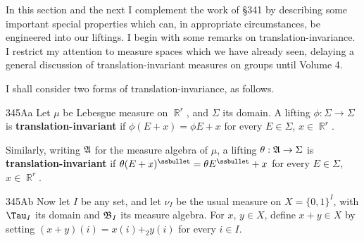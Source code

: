 
\def\upr{\mathop{\text{upr}}}

\def\chaptername{Liftings}
\def\sectionname{Translation-invariant liftings}


In this section and the next I complement the work of \S341 by
describing some
important special properties which can, in appropriate circumstances, be
engineered into our liftings.   I begin with some remarks on
translation-invariance.   I restrict
my attention to measure spaces which we have already seen, delaying a
general discussion of translation-invariant measures on groups until
Volume 4.

 I shall
consider two forms of translation-invariance, as follows.

\spheader 345Aa Let $\mu$ be Lebesgue measure on $\BbbR^r$, and
$\Sigma$ its domain.   A lifting $\phi:\Sigma\to\Sigma$ is {\bf
translation-invariant} if $\phi(E+x)=\phi E+x$ for every $E\in\Sigma$,
$x\in\BbbR^r$.   

Similarly, writing $\frak A$ for the measure algebra of $\mu$, a
lifting $\theta:\frak A\to\Sigma$ is {\bf translation-invariant} if
$\theta(E+x)^{\ssbullet}=\theta E^{\ssbullet}+x$ for every $E\in\Sigma$,
$x\in\BbbR^r$.


\spheader 345Ab Now let $I$ be any set, and let $\nu_I$ be the usual
measure on $X=\{0,1\}^I$, with $\Tau_I$ its domain and $\frak B_I$ its
measure algebra.   For $x$, $y\in X$, define $x+y\in X$ by setting
$(x+y)(i)=x(i)+_2y(i)$ for every $i\in I$.

